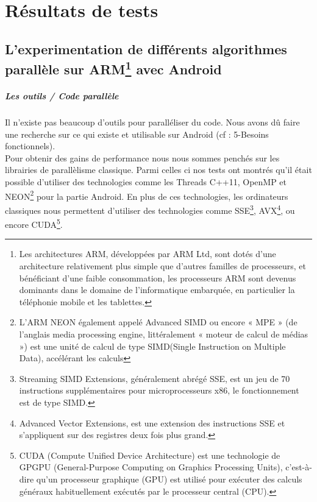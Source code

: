 \chapter{Résultats de tests}

\section{ L'experimentation de différents algorithmes parallèle sur ARM\footnote{Les architectures ARM, développées par ARM Ltd, sont dotés d'une architecture relativement plus simple que d'autres familles de processeurs, et bénéficiant d'une faible consommation, les processeurs ARM sont devenus dominants dans le domaine de l'informatique embarquée, en particulier la téléphonie mobile et les tablettes.} avec Android }

\paragraph{Les outils / Code parallèle \\}

	Il n'existe pas beaucoup d'outils pour paralléliser du code. Nous avons dû faire une recherche sur ce qui existe et utilisable sur Android (cf : 5-Besoins fonctionnels). \\

	Pour obtenir des gains de performance nous nous sommes penchés sur les librairies de parallèlisme classique. Parmi celles ci nos tests ont montrés qu'il était possible d'utiliser des technologies comme les Threads C++11, OpenMP et NEON\footnote{L'ARM NEON également appelé Advanced SIMD ou encore « MPE » (de l'anglais media processing engine, littéralement « moteur de calcul de médias ») est une unité de calcul de type SIMD(Single Instruction on Multiple Data), accélérant les calculs} pour la partie Android. En plus de ces technologies, les ordinateurs classiques nous permettent d'utiliser des technologies comme SSE\footnote{Streaming SIMD Extensions, généralement abrégé SSE, est un jeu de 70 instructions supplémentaires pour microprocesseurs x86, le fonctionnement est de type SIMD.}, AVX\footnote{Advanced Vector Extensions, est une extension  des instructions SSE et s'appliquent sur des registres deux fois plus grand.}, ou encore CUDA\footnote{CUDA (Compute Unified Device Architecture) est une technologie de GPGPU (General-Purpose Computing on Graphics Processing Units), c'est-à-dire qu'un processeur graphique (GPU) est utilisé pour exécuter des calculs généraux habituellement exécutés par le processeur central (CPU).}.\\

